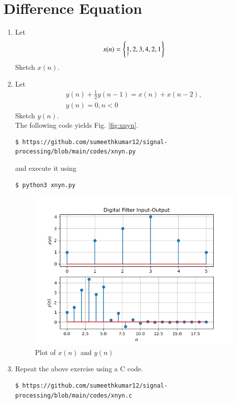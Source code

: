 \documentclass[journal,12pt,twocolumn]{IEEEtran}
\renewcommand\thesection{\arabic{section}}
\begin{document}
\section{Difference Equation}
\begin{enumerate}[label=\thesection.\arabic*,ref=\thesection.\theenumi]
\item Let
\begin{equation}
x(n) = \left\{\underset{\uparrow}{1},2,3,4,2,1\right\}
\end{equation}
Sketch $x(n)$.
\item Let
\begin{multline}
\label{eq:iir_filter}
y(n) + \frac{1}{2}y(n-1) = x(n) + x(n-2), 
\\
y(n) = 0, n < 0
\end{multline}
Sketch $y(n)$.\\
\solution The following code yields Fig. \eqref{fig:xnyn}.
\begin{lstlisting}
$ https://github.com/sumeethkumar12/signal-processing/blob/main/codes/xnyn.py
\end{lstlisting}
and execute it using
\begin{lstlisting}
$ python3 xnyn.py
\end{lstlisting}
\begin{figure}[!ht]
	\centering
	\includegraphics[width=\columnwidth]{xnyn.png}
	\caption{Plot of $x(n)$ and $y(n)$}
	\label{fig:xnyn}
\end{figure}
\item Repeat the above exercise using a C code.
\begin{lstlisting}
$ https://github.com/sumeethkumar12/signal-processing/blob/main/codes/xnyn.c
\end{lstlisting}

\end{enumerate}
\end{document}
